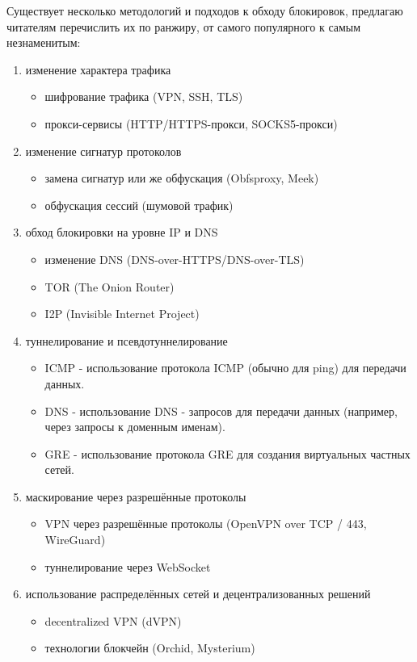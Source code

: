\documentclass[utf8,14pt,a4paper,oneside,russian]{book}
\begin{document}
Существует несколько методологий и подходов к обходу блокировок, предлагаю читателям перечислить их по ранжиру, от самого популярного к самым
незнаменитым:

\begin{enumerate}
    \item изменение характера трафика
          \begin{itemize}
              \item шифрование трафика (VPN, SSH, TLS)
              \item прокси-сервисы (HTTP/HTTPS-прокси, SOCKS5-прокси)
          \end{itemize}
    \item изменение сигнатур протоколов
          \begin{itemize}
              \item замена сигнатур или же обфускация (Obfsproxy, Meek)
              \item обфускация сессий (шумовой трафик)
          \end{itemize}
    \item обход блокировки на уровне IP и DNS
          \begin{itemize}
              \item изменение DNS (DNS-over-HTTPS/DNS-over-TLS)
              \item TOR (The Onion Router)
              \item I2P (Invisible Internet Project)
          \end{itemize}
    \item туннелирование и псевдотуннелирование
          \begin{itemize}
              \item ICMP - использование протокола ICMP (обычно для ping) для передачи данных.
              \item DNS - использование DNS - запросов для передачи данных (например, через запросы к доменным именам).
              \item GRE - использование протокола GRE для создания виртуальных частных сетей.
          \end{itemize}
    \item маскирование через разрешённые протоколы
          \begin{itemize}
              \item VPN через разрешённые протоколы (OpenVPN over TCP / 443, WireGuard)
              \item туннелирование через WebSocket
          \end{itemize}
    \item  использование распределённых сетей и децентрализованных решений
          \begin{itemize}
              \item decentralized VPN (dVPN)
              \item технологии блокчейн (Orchid, Mysterium)
          \end{itemize}
\end{enumerate}
\end{document}
